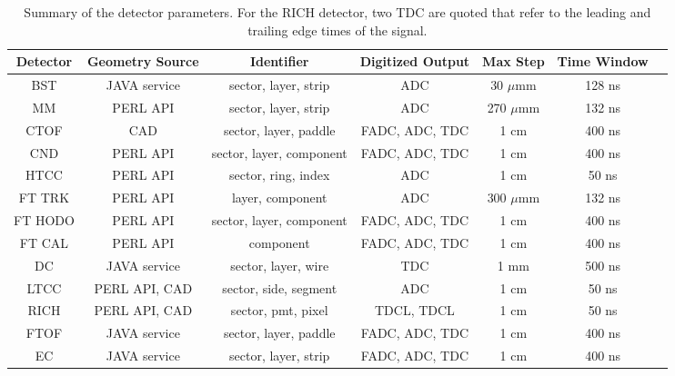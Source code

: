 \begin{table*}
    \begin{center}
        \begin{tabular}{| c | c | c | c | c | c | c | }
            \hline \hline
Detector &  Geometry Source &           Identifier  &  Digitized Output  &  Max Step & Time Window  \\
            \hline
BST       &     JAVA service  & sector, layer, strip      &  ADC             & 30 $\mu$mm  & 128 ns    \\
MM        &     PERL API      & sector, layer, strip      &  ADC             & 270 $\mu$mm & 132 ns    \\
CTOF      &     CAD           & sector, layer, paddle     &  FADC, ADC, TDC  & 1 cm        & 400 ns    \\
CND       &     PERL API      & sector, layer, component  &  FADC, ADC, TDC  & 1 cm        & 400 ns    \\
HTCC      &     PERL API      & sector, ring, index       &  ADC             & 1 cm        & 50 ns     \\
FT TRK    &     PERL API      & layer, component          &  ADC             & 300 $\mu$mm & 132 ns    \\
FT HODO   &     PERL API      & sector, layer, component  &  FADC, ADC, TDC  & 1 cm        & 400 ns    \\
FT CAL    &     PERL API      & component                 &  FADC, ADC, TDC  & 1 cm        & 400 ns    \\
DC        &     JAVA service  & sector, layer, wire       &  TDC             & 1 mm        & 500 ns    \\
LTCC      &     PERL API, CAD & sector, side, segment     &  ADC             & 1 cm        &  50 ns    \\
RICH      &     PERL API, CAD & sector, pmt, pixel        &  TDCL, TDCL      & 1 cm        &  50 ns    \\
FTOF      &     JAVA service  & sector, layer, paddle     &  FADC, ADC, TDC  & 1 cm        & 400 ns    \\
EC        &     JAVA service  & sector, layer, strip      &  FADC, ADC, TDC  & 1 cm        & 400 ns    \\
            \hline \hline
        \end{tabular}
    \end{center}
    \caption{Summary of the detector parameters. For the RICH detector, two TDC are quoted that refer to
    the leading and trailing edge times of the signal.}\label{tab:summary}
\end{table*}
